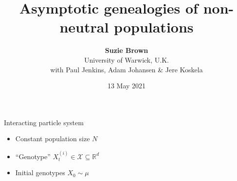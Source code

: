 \documentclass[aspectratio=169]{beamer}
\title[]{Asymptotic genealogies of non-neutral populations}
\author[Suzie Brown]{\textbf{Suzie Brown} \\[5pt] University of Warwick, U.K. \\ with Paul Jenkins, Adam Johansen \& Jere Koskela}
\date{13 May 2021}
\theoremstyle{definition}
\begin{document}
\begin{frame}
\maketitle
\end{frame}


\begin{frame}{Interacting particle system}
\begin{itemize}
\item Constant population size $N$
\item ``Genotype'' $X_t^{(i)} \in \mathcal{X} \subseteq \mathbb{R}^d$
\item Initial genotypes $X_0 \sim \mu$
\end{itemize}
\end{frame}
\end{document}
